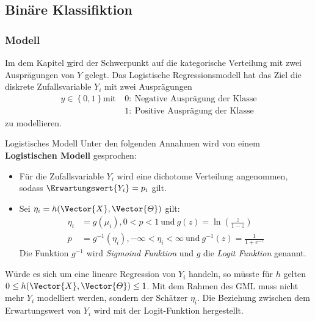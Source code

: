 \subsection{Binäre Klassifiktion}
\subsubsection{Modell}
Im dem Kapitel \href{ref: Kapitel Logistische Regression} wird der Schwerpunkt auf die kategorische Verteilung mit zwei Ausprägungen von $Y$ gelegt. Das Logistische Regressionsmodell hat das Ziel die diskrete Zufallsvariable $Y_i$ mit zwei Ausprägungen 
\begin{align}
	y\in \left\lbrace 0,1 \right \rbrace 
	\text{mit}\:& 0 : \: \text{Negative Ausprägung der Klasse} \\
	& 1 : \: \text{Positive Ausprägung der Klasse}
\end{align} zu modellieren. \\

\begin{Definition}{Logistisches Modell}
	Unter den folgenden Annahmen wird von einem \textbf{Logistischen Modell} gesprochen:
	\begin{itemize}
		\item Für die Zufallsvariable $Y_i$ wird eine dichotome Verteilung angenommen, sodass $\Erwartungswert{Y_i} = p_i$ gilt.
		\item Sei $\eta_i =  h(\Vector{X}, \Vector{\varTheta})$ gilt: 
		\begin{align}
			\eta_i &= g\left(\mu_i\right), 0 <p <1\:\text{und}\: g(z)=\ln\left(\frac{z}{1-z}\right)\\
			p &= g^{-1}(\eta_i), -\infty <\eta_i <\infty\:\text{und}\: g^{-1}(z)=\frac{1}{1+e^{-z}}
		\end{align}
		Die Funktion $g^{-1}$ wird \textit{Sigmoind Funktion} und $g$ die \textit{Logit Funktion} genannt.
	\end{itemize}
\end{Definition}


Würde es sich um eine lineare Regression von $Y_i$ handeln, so müsste für $h$ gelten $0 \leq h(\Vector{X}, \Vector{\varTheta}) \leq 1$. Mit dem Rahmen des \gls{GML} muss nicht mehr $Y_i$ modelliert werden, sondern der Schätzer $\eta_i$. Die Beziehung zwischen dem Erwartungswert von $Y_i$ wird mit der Logit-Funktion hergestellt.


